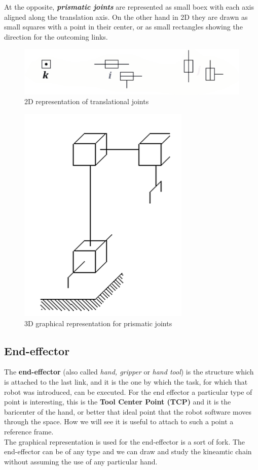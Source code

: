 At the opposite, \textit{\textbf{prismatic joints}} are represented as small boex with each axis aligned along the translation axis. On the other hand in 2D they are drawn as small squares with a point in their center, or as small rectangles showing the direction for the outcoming links.

\begin{figure}
    \centering
    \includegraphics[scale=0.5]{img/transl_joints.png}
    \caption{2D representation of translational joints}
\end{figure}

\begin{figure}
    \centering
    \includegraphics[scale=0.6]{img/transl_joints_3D.png}
    \caption{3D graphical representation for prismatic joints}
\end{figure}

\subsection{End-effector}
The \textbf{end-effector} (also called \textit{hand, gripper} or \textit{hand tool}) is the structure which is attached to the last link, and it is the one by which the task, for which that robot was introduced, can be executed. For the end effector a particular type of point is interesting, this is the \textbf{Tool Center Point (TCP)} and it is the baricenter of the hand, or better that ideal point that the robot software moves through the space. How we will see it is useful to attach to such a point a reference frame. \\
The graphical representation is used for the end-effector is a sort of fork. The end-effector can be of any type and we can draw and study the kineamtic chain without assuming the use of any particular hand.

